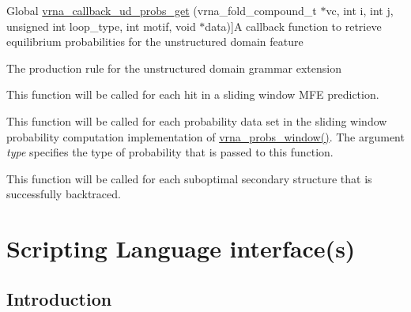 \begin{DoxyRefList}
%
Global \mbox{\hyperlink{group__domains__up_gaa10ba1b6f1e179ea84c5caca9cdaae67}{vrna\+\_\+callback\+\_\+ud\+\_\+probs\+\_\+get}} (vrna\+\_\+fold\+\_\+compound\+\_\+t $\ast$vc, int i, int j, unsigned int loop\+\_\+type, int motif, void $\ast$data)]A callback function to retrieve equilibrium probabilities for the unstructured domain feature  
\item[\label{callbacks__callbacks000012}%
\Hypertarget{callbacks__callbacks000012}%
Global \mbox{\hyperlink{group__domains__up_ga4fdfc02c1b660c07f2d887772f02a0a1}{vrna\+\_\+callback\+\_\+ud\+\_\+production}} (vrna\+\_\+fold\+\_\+compound\+\_\+t $\ast$vc, void $\ast$data)]The production rule for the unstructured domain grammar extension  
\item[\label{callbacks__callbacks000008}%
\Hypertarget{callbacks__callbacks000008}%
Global \mbox{\hyperlink{group__mfe__fold_ga4f3e5bc214ef803074ace313cb9571b4}{vrna\+\_\+mfe\+\_\+window\+\_\+callback}} (int start, int end, const char $\ast$structure, float en, void $\ast$data)]This function will be called for each hit in a sliding window M\+FE prediction.  
\item[\label{callbacks__callbacks000007}%
\Hypertarget{callbacks__callbacks000007}%
Global \mbox{\hyperlink{_l_pfold_8h_abe710a1182e6db69cc75329dfc9bed67}{vrna\+\_\+probs\+\_\+window\+\_\+callback}} (F\+L\+T\+\_\+\+O\+R\+\_\+\+D\+BL $\ast$pr, int pr\+\_\+size, int i, int max, unsigned int type, void $\ast$data)]This function will be called for each probability data set in the sliding window probability computation implementation of \mbox{\hyperlink{group__local__pf__fold_ga70ec33810fa17a9f67a7c59f156d0137}{vrna\+\_\+probs\+\_\+window()}}. The argument {\itshape type} specifies the type of probability that is passed to this function.  
\item[\label{callbacks__callbacks000009}%
\Hypertarget{callbacks__callbacks000009}%
Global \mbox{\hyperlink{group__subopt__wuchty_gaa0270c66d04f59e750401695b8282e04}{vrna\+\_\+subopt\+\_\+callback}} (const char $\ast$stucture, float energy, void $\ast$data)]This function will be called for each suboptimal secondary structure that is successfully backtraced. 
\end{DoxyRefList}\hypertarget{wrappers}{}\section{Scripting Language interface(s)}\label{wrappers}
\hypertarget{wrappers_scripting_intro}{}\subsection{Introduction}\label{wrappers_scripting_intro}
